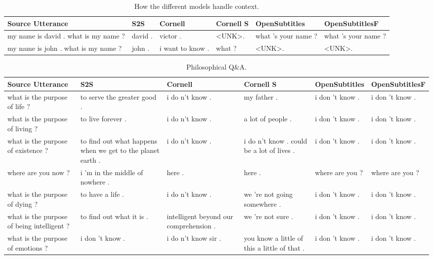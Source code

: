 \documentclass[12pt]{article}
\begin{document}
\begin{table}[H]
	\centering
	\begin{tabular}{|L{2.3cm}|L{2.3cm}|L{2.3cm}|L{2.3cm}|L{2.3cm}|L{2.3cm}|}
		\hline
		\textbf{Source Utterance} & \textbf{S2S} & \textbf{Cornell} & \textbf{Cornell S} & \textbf{OpenSubtitles} & \textbf{OpenSubtitlesF}\\ \hline
		my name is david . what is my name ? & david . & victor . & \textless UNK\textgreater . & what 's your name ? & what 's your name ?
		\\ \hline
		my name is john . what is my name ? & john . & i want to know . & what ? & \textless UNK\textgreater . & \textless UNK\textgreater .
		\\ \hline
		
	\end{tabular}
	\caption{How the different models handle context.}	
	\label{table:contextNCM}
\end{table}
\begin{table}[H]
	\centering
	\begin{tabular}{|L{2.3cm}|L{2.3cm}|L{2.3cm}|L{2.3cm}|L{2.3cm}|L{2.3cm}|}
		\hline
		\textbf{Source Utterance} & \textbf{S2S} & \textbf{Cornell} & \textbf{Cornell S} & \textbf{OpenSubtitles} & \textbf{OpenSubtitlesF}\\ \hline
		what is the purpose of life ? & to serve the greater good . & i do n't know . & my father . & i don 't know . & i don 't know .
		\\ \hline
		what is the purpose of living ? & to live forever . & i do n't know . & a lot of people . & i don 't know . & i don 't know .
		\\ \hline
		what is the purpose of existence ? & to find out what happens when we get to the planet earth . & i do n't know . & i do n't know . could be a lot of lives . & i don 't know . & i don 't know .
		\\ \hline
		where are you now ? & i ’m in the middle of nowhere . & here . & here . & where are you ? & where are you ?
		\\ \hline
		what is the purpose of dying ? & to have a life . & i do n't know . & we 're not going somewhere . & i don 't know . & i don 't know .
		\\ \hline
		what is the purpose of being intelligent ? & to find out what it is . & intelligent beyond our comprehension .  & we 're not sure . & i don 't know . & i don 't know .
		\\ \hline
		what is the purpose of emotions ? & i don ’t know . & i do n't know sir .  & you know a little of this a little of that . & i don 't know . & i don 't know .
		\\ \hline
		
	\end{tabular}
	\caption{Philosophical Q\&A.}	
	\label{table:philosophicalNCM}
\end{table}
\end{document}
